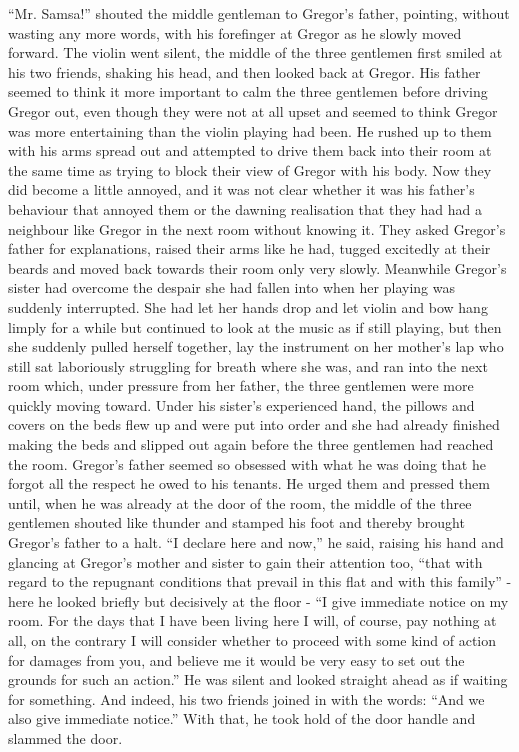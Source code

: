 \documentclass[12pt]{report}
\begin{document}
``Mr. Samsa!'' shouted the middle gentleman to Gregor's father,
pointing, without wasting any more words, with his forefinger at Gregor
as he slowly moved forward. The violin went silent, the middle of the
three gentlemen first smiled at his two friends, shaking his head, and
then looked back at Gregor. His father seemed to think it more important
to calm the three gentlemen before driving Gregor out, even though they
were not at all upset and seemed to think Gregor was more entertaining
than the violin playing had been. He rushed up to them with his arms
spread out and attempted to drive them back into their room at the same
time as trying to block their view of Gregor with his body. Now they did
become a little annoyed, and it was not clear whether it was his
father's behaviour that annoyed them or the dawning realisation that
they had had a neighbour like Gregor in the next room without knowing
it. They asked Gregor's father for explanations, raised their arms like
he had, tugged excitedly at their beards and moved back towards their
room only very slowly. Meanwhile Gregor's sister had overcome the
despair she had fallen into when her playing was suddenly interrupted.
She had let her hands drop and let violin and bow hang limply for a
while but continued to look at the music as if still playing, but then
she suddenly pulled herself together, lay the instrument on her mother's
lap who still sat laboriously struggling for breath where she was, and
ran into the next room which, under pressure from her father, the three
gentlemen were more quickly moving toward. Under his sister's
experienced hand, the pillows and covers on the beds flew up and were
put into order and she had already finished making the beds and slipped
out again before the three gentlemen had reached the room. Gregor's
father seemed so obsessed with what he was doing that he forgot all the
respect he owed to his tenants. He urged them and pressed them until,
when he was already at the door of the room, the middle of the three
gentlemen shouted like thunder and stamped his foot and thereby brought
Gregor's father to a halt. ``I declare here and now,'' he said, raising
his hand and glancing at Gregor's mother and sister to gain their
attention too, ``that with regard to the repugnant conditions that
prevail in this flat and with this family'' - here he looked briefly but
decisively at the floor - ``I give immediate notice on my room. For the
days that I have been living here I will, of course, pay nothing at all,
on the contrary I will consider whether to proceed with some kind of
action for damages from you, and believe me it would be very easy to set
out the grounds for such an action.'' He was silent and looked straight
ahead as if waiting for something. And indeed, his two friends joined in
with the words: ``And we also give immediate notice.'' With that, he
took hold of the door handle and slammed the door.
\end{document}
